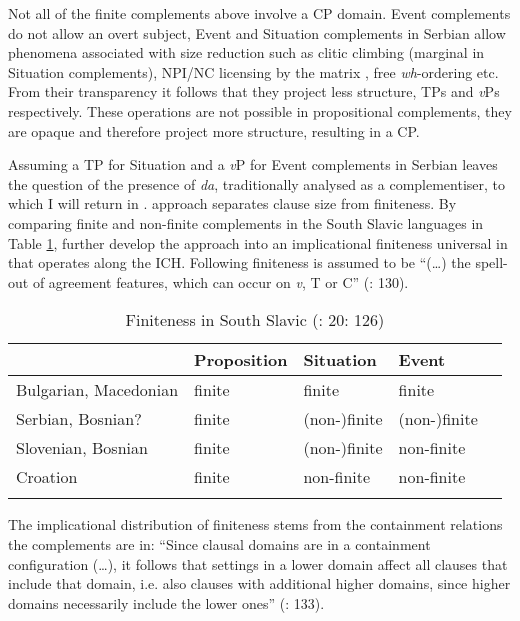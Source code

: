 \documentclass[output=paper]{langscibook}
\begin{document}
Not all of the finite complements above involve a CP domain. Event complements do not allow an overt subject, Event and Situation complements in Serbian allow phenomena associated with size reduction such as clitic climbing (marginal in Situation complements), NPI/NC licensing by the matrix , free \emph{wh}-ordering etc. From their transparency it follows that they project less structure, TPs and \emph{v}Ps respectively. These operations are not possible in propositional complements, they are opaque and therefore project more structure, resulting in a CP. 

Assuming a TP for Situation and a \emph{v}P for Event complements in Serbian leaves the question of the presence of \emph{da}, traditionally analysed as a complementiser, to which I will return in .
 approach separates clause size from finiteness. By comparing finite and non-finite complements in the South Slavic languages in Table \ref{Pajtab4}, \citet{wurmbrandetal2020} further develop the approach into an implicational finiteness universal in  that operates along the ICH. Following \citet{adger2007} finiteness is assumed to be “(…) the spell-out of agreement features, which can occur on \emph{v}, T or C” (\citealt{wurmbrandetal2020}: 130).

\begin{table}
\caption{Finiteness in South Slavic (\citealt{wurmbrandetal2020}: 20: 126)}
\label{Pajtab4}
 \begin{tabular}{l llll}
  \lsptoprule
            & Proposition & Situation  & Event \\
  \midrule
  Bulgarian, Macedonian  &  finite &   finite  &   finite    \\
  Serbian, Bosnian? & finite  & (non-)finite  & (non-)finite\\
  Slovenian, Bosnian & finite & (non-)finite  &    non-finite    \\
  Croation &   finite &   non-finite  &    non-finite     \\
  \lspbottomrule
 \end{tabular}
\end{table}


The implicational distribution of finiteness stems from the containment relations the complements are in: “Since clausal domains are in a containment configuration (…), it follows that settings in a lower domain affect all clauses that include that domain, i.e. also clauses with additional higher domains, since higher domains necessarily include the lower ones'' (\citealt{wurmbrandetal2020}: 133). 
\end{document}
